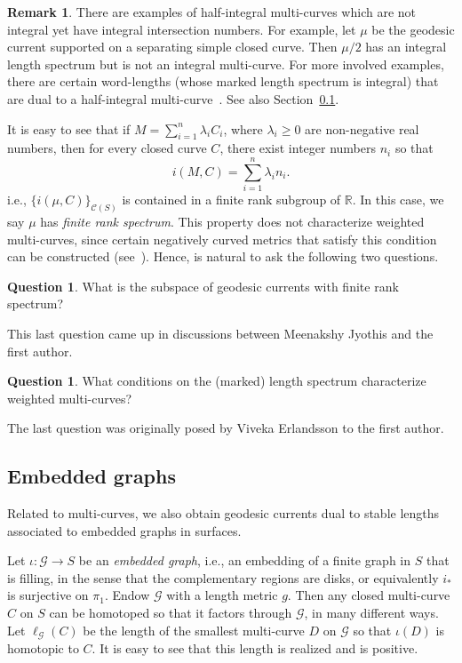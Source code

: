 \documentclass[11pt]{amsart}
\numberwithin{equation}{section}
\numberwithin{figure}{section}
\theoremstyle{definition}
\newtheorem{remark}[theorem]{Remark}
\newtheorem{question}[theorem]{Question}
\theoremstyle{plain}
\newcommand{\Curves}{\mathcal{C}}
\begin{document}
\begin{remark}
  There are examples of half-integral multi-curves which are not integral yet have integral intersection numbers.
For example, let $\mu$ be the geodesic current supported on a
  separating simple closed curve. Then $\mu/2$ has an integral
  length spectrum but is not an integral multi-curve. 
  For more involved examples, there are certain word-lengths (whose marked length spectrum is integral) that are
  dual to a half-integral multi-curve~\cite[Theorem~1.1]{Erlandsson:WordLength}. See also Section~\ref{subsec:embedded_graphs}.
\end{remark}

It is easy to see that if $M = \sum_{i=1}^n \lambda_i C_i$, where $\lambda_i \geq 0$ are non-negative real numbers, then for every closed curve $C$, there exist integer numbers $n_i$ so that
\begin{equation}
i(M, C) = \sum_{i=1}^n \lambda_i n_i.
\label{eq:weighted_multicurve}
\end{equation}
i.e., $\{i(\mu,C)\}_{\Curves(S)}$ is contained in a finite rank subgroup of $\mathbb{R}$. In this case, we say $\mu$ has \emph{finite rank spectrum}.
This property does not characterize weighted multi-curves, since certain negatively curved metrics that satisfy this condition can be constructed (see~\cite{Agol25:Spectrum}).
Hence, is natural to ask the following two questions.

\begin{question}
    What is the subspace of geodesic currents with finite rank spectrum?
\end{question}

This last question came up in discussions between Meenakshy Jyothis and the first author.

\begin{question}
    What conditions on the (marked) length spectrum characterize weighted multi-curves?
\end{question}

The last question was originally posed by Viveka Erlandsson to the first author.

\subsection{Embedded graphs}
\label{subsec:embedded_graphs}
Related to multi-curves, we also obtain geodesic currents dual to stable lengths associated to embedded graphs in surfaces.

 Let $\iota \colon \mathcal{G} \to S$ be an \emph{embedded graph}, i.e., an embedding of a finite graph in $S$ that is filling, in the sense that the complementary regions are disks, or equivalently $i_*$ is surjective on $\pi_1$.
 Endow $\mathcal{G}$ with a length metric $g$. Then any closed multi-curve $C$ on $S$ can be homotoped so that it factors through $\mathcal{G}$, in many different ways. Let $\ell_{\mathcal{G}}(C)$ be the length of the smallest
 multi-curve $D$ on $\mathcal{G} $ so that $\iota(D)$ is homotopic to $C$. It is easy to see that this length is realized and is positive. 
\end{document}

